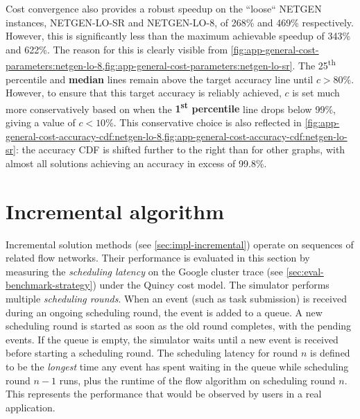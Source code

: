 Cost convergence also provides a robust speedup on the ``loose`` NETGEN instances, NETGEN-LO-SR and NETGEN-LO-8, of 268\% and 469\% respectively. However, this is significantly less than the maximum achievable speedup of 343\% and 622\%. The reason for this is clearly visible from \cref{fig:app-general-cost-parameters:netgen-lo-8,fig:app-general-cost-parameters:netgen-lo-sr}. The 25\textsuperscript{th} percentile and \textbf{\color{matplotlib_cyan} median} lines remain above the target accuracy line until $c > 80\%$. However, to ensure that this target accuracy is reliably achieved, $c$ is set much more conservatively based on when the \textbf{\color{matplotlib_blue} 1\textsuperscript{st} percentile} line drops below 99\%, giving a value of $c < 10\%$. This conservative choice is also reflected in \cref{fig:app-general-cost-accuracy-cdf:netgen-lo-8,fig:app-general-cost-accuracy-cdf:netgen-lo-sr}: the accuracy CDF is shifted further to the right than for other graphs, with almost all solutions achieving an accuracy in excess of 99.8\%.

\section{Incremental algorithm} \label{sec:eval-incremental}

Incremental solution methods (see \cref{sec:impl-incremental}) operate on sequences of related flow networks. Their performance is evaluated in this section by measuring the \emph{scheduling latency} on the Google cluster trace (see \cref{sec:eval-benchmark-strategy}) under the Quincy cost model. The simulator performs multiple \emph{scheduling rounds}. When an event (such as task submission) is received during an ongoing scheduling round, the event is added to a queue. A new scheduling round is started as soon as the old round completes, with the pending events. If the queue is empty, the simulator waits until a new event is received before starting a scheduling round. The scheduling latency for round $n$ is defined to be the \emph{longest} time any event has spent waiting in the queue while scheduling round $n-1$ runs, plus the runtime of the flow algorithm on scheduling round $n$. This represents the performance that would be observed by users in a real application.


